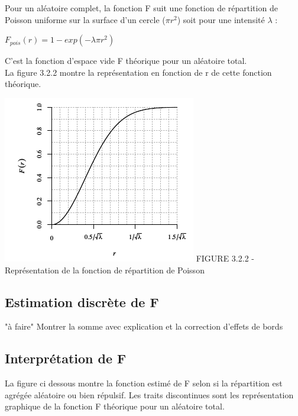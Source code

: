 \documentclass[french,12pt,a4paper]{report}
\begin{document}
\begin{minipage}{0.45\linewidth}
Pour un aléatoire complet, la fonction F suit une fonction de répartition de Poisson uniforme sur la surface d'un cercle (\begin{math} \pi r^2 \end{math}) soit pour une intensité \begin{math} \lambda \end{math} : 
\begin{center}\begin{math} F_{pois}(r) = 1 - exp(-\lambda \pi r^2) \end{math}\end{center}
C'est la fonction d'espace vide F théorique pour un aléatoire total.\\
La figure 3.2.2 montre la représentation en fonction de r de cette fonction théorique.
\end{minipage}\hfill
\begin{minipage}{0.45\linewidth}
\includegraphics[scale=0.7]{images/poisson.png}
\small{FIGURE 3.2.2 - Représentation de la fonction de répartition de Poisson}
\end{minipage}


\subsection{Estimation discrète de F}
"à faire"
Montrer la somme avec explication et la correction d'effets de bords


\subsection{Interprétation de F}
La figure ci dessous montre la fonction estimé de F selon si la répartition est agrégée aléatoire ou bien répulsif. Les traits discontinues sont les représentation graphique de la fonction F théorique pour un aléatoire total.\\
\end{document}
